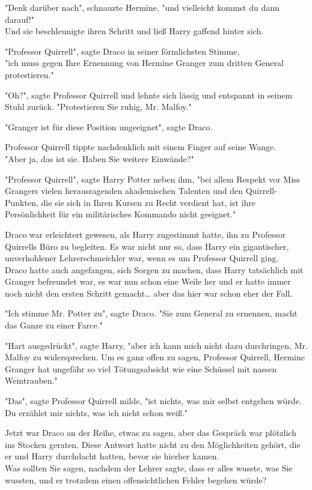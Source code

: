 {"Denk darüber nach", schnauzte Hermine, "und vielleicht kommst du dann darauf!"\\ Und sie beschleunigte ihren Schritt und ließ Harry gaffend hinter sich.

"Professor Quirrell", sagte Draco in seiner förmlichsten Stimme,\\ "ich muss gegen Ihre Ernennung von Hermine Granger zum dritten General protestieren."

"Oh?", sagte Professor Quirrell und lehnte sich lässig und entspannt in seinem Stuhl zurück. "Protestieren Sie ruhig, Mr. Malfoy."

"Granger ist für diese Position ungeeignet", sagte Draco.

Professor Quirrell tippte nachdenklich mit einem Finger auf seine Wange.\\ "Aber ja, das ist sie. Haben Sie weitere Einwände?"

"Professor Quirrell", sagte Harry Potter neben ihm, "bei allem Respekt vor Miss Grangers vielen herausragenden akademischen Talenten und den Quirrell-Punkten, die sie sich in Ihren Kursen zu Recht verdient hat, ist ihre Persönlichkeit für ein militärisches Kommando nicht geeignet."

Draco war erleichtert gewesen, als Harry zugestimmt hatte, ihn zu Professor Quirrells Büro zu begleiten. Es war nicht nur so, dass Harry ein gigantischer, unverhohlener Lehrerschmeichler war, wenn es um Professor Quirrell ging.\\ Draco hatte auch angefangen, sich Sorgen zu machen, dass Harry tatsächlich mit Granger befreundet war, es war nun schon eine Weile her und er hatte immer noch nicht den ersten Schritt gemacht… aber das hier war schon eher der Fall.

"Ich stimme Mr. Potter zu", sagte Draco. "Sie zum General zu ernennen, macht das Ganze zu einer Farce."

"Hart ausgedrückt", sagte Harry, "aber ich kann mich nicht dazu durchringen, Mr.\\ Malfoy zu widersprechen. Um es ganz offen zu sagen, Professor Quirrell, Hermine Granger hat ungefähr so viel Tötungsabsicht wie eine Schüssel mit nassen Weintrauben."

"Das", sagte Professor Quirrell milde, "ist nichts, was mir selbst entgehen würde.\\ Du erzählst mir nichts, was ich nicht schon weiß."

Jetzt war Draco an der Reihe, etwas zu sagen, aber das Gespräch war plötzlich ins Stocken geraten. Diese Antwort hatte nicht zu den Möglichkeiten gehört, die er und Harry durchdacht hatten, bevor sie hierher kamen.\\ Was sollten Sie sagen, nachdem der Lehrer sagte, dass er alles wusste, was Sie wussten, und er trotzdem einen offensichtlichen Fehler begehen würde?

}

